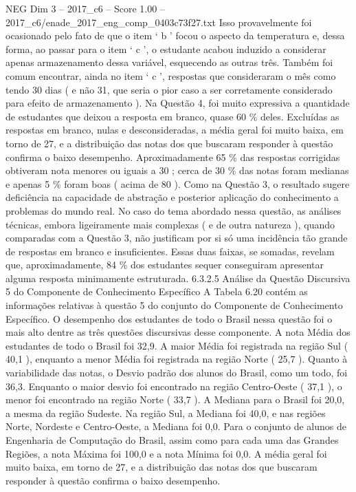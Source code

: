 \begin{textsample}{NEG Dim 3 – 2017\_c6 – Score 1.00 – 2017\_c6/enade\_2017\_eng\_comp\_0403c73f27.txt}
Isso provavelmente foi ocasionado pelo fato de que o item ‘ b ’ focou o aspecto da temperatura e, dessa forma, ao passar para o item ‘ c ’, o estudante acabou induzido a considerar apenas armazenamento dessa variável, esquecendo as outras três.
Também foi comum encontrar, ainda no item ‘ c ’, respostas que consideraram o mês como tendo 30 dias ( e não 31, que seria o pior caso a ser corretamente considerado para efeito de armazenamento ).
Na Questão 4, foi muito expressiva a quantidade de estudantes que deixou a resposta em branco, quase 60 \% deles.
Excluídas as respostas em branco, nulas e desconsideradas, a média geral foi muito baixa, em torno de 27, e a distribuição das notas dos que buscaram responder à questão confirma o baixo desempenho.
Aproximadamente 65 \% das respostas corrigidas obtiveram nota menores ou iguais a 30 ; cerca de 30 \% das notas foram medianas e apenas 5 \% foram boas ( acima de 80 ).
Como na Questão 3, o resultado sugere deficiência na capacidade de abstração e posterior aplicação do conhecimento a problemas do mundo real.
No caso do tema abordado nessa questão, as análises técnicas, embora ligeiramente mais complexas ( e de outra natureza ), quando comparadas com a Questão 3, não justificam por si só uma incidência tão grande de respostas em branco e insuficientes.
Essas duas faixas, se somadas, revelam que, aproximadamente, 84 \% dos estudantes sequer conseguiram apresentar alguma resposta minimamente estruturada. 6.3.2.5 Análise da Questão Discursiva 5 do Componente de Conhecimento Específico A Tabela 6.20 contém as informações relativas à questão 5 do conjunto do Componente de Conhecimento Específico.
O desempenho dos estudantes de todo o Brasil nessa questão foi o mais alto dentre as três questões discursivas desse componente.
A nota Média dos estudantes de todo o Brasil foi 32,9.
A maior Média foi registrada na região Sul ( 40,1 ), enquanto a menor Média foi registrada na região Norte ( 25,7 ).
Quanto à variabilidade das notas, o Desvio padrão dos alunos do Brasil, como um todo, foi 36,3.
Enquanto o maior desvio foi encontrado na região Centro-Oeste ( 37,1 ), o menor foi encontrado na região Norte ( 33,7 ).
A Mediana para o Brasil foi 20,0, a mesma da região Sudeste.
Na região Sul, a Mediana foi 40,0, e nas regiões Norte, Nordeste e Centro-Oeste, a Mediana foi 0,0.
Para o conjunto de alunos de Engenharia de Computação do Brasil, assim como para cada uma das Grandes Regiões, a nota Máxima foi 100,0 e a nota Mínima foi 0,0.
A média geral foi muito baixa, em torno de 27, e a distribuição das notas dos que buscaram responder à questão confirma o baixo desempenho.

\end{textsample}
